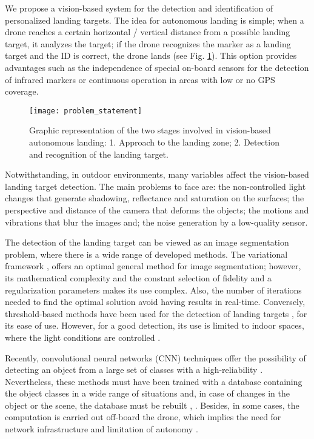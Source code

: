 We propose a vision-based system for the detection and identification of personalized landing targets. The idea for autonomous landing is simple; when a drone reaches a certain horizontal / vertical distance from a possible landing target, it analyzes the target; if the drone recognizes the marker as a landing target and the ID is correct, the drone lands (see Fig. \ref{fig:visionbased_landing_problem_sketch}). This option provides advantages such as the independence of special on-board sensors for the detection of infrared markers or continuous operation in areas with low or no GPS coverage. 

\begin{figure}[!ht]
    \centering
    \texttt{[image: problem\_statement]}        
    \caption{Graphic representation of the two stages involved in vision-based autonomous landing: 1. Approach to the landing zone; 2. Detection and recognition of the landing target.}\label{fig:visionbased_landing_problem_sketch}
\end{figure}

Notwithstanding, in outdoor environments, many variables affect the vision-based landing target detection. 
The main problems to face are: the non-controlled light changes that generate shadowing, reflectance and saturation on the surfaces; the perspective and distance of the camera that deforms the objects; the motions and vibrations that blur the images and; the noise generation by a low-quality sensor.


The detection of the landing target can be viewed as an image segmentation problem, where there is a wide range of developed methods. The variational framework \citep{Mumford.Shah:CPAM:1989}, offers an optimal general method for image segmentation; however, its mathematical complexity and the constant selection of fidelity and a regularization parameters makes its use complex. Also, the number of iterations needed to find the optimal solution avoid having results in real-time. Conversely, threshold-based methods have been used for the detection of landing targets \citep{Lacroix.Caballero:IROS:2006}, \citep{Lange.Sunderhauf.ea:SIMPAR:2008} for its ease of use. However, for a good detection, its use is limited to indoor spaces, where the light conditions are controlled \citep{Araar.Aouf.ea:IROS:2017}. 

Recently, convolutional neural networks (CNN) techniques offer the possibility of detecting an object from a large set of classes with a high-reliability \citep{Carrio.Sampedro.ea:JS:2017}. Nevertheless, these methods must have been trained with a database containing the object classes in a wide range of situations and, in case of changes in the object or the scene, the database must be rebuilt \citep{Yao.Yu.ea:CCC:2017}, \citep{Furukawa:TechRep:2018}. Besides, in some cases, the computation is carried out off-board the drone, which implies the need for network infrastructure and limitation of autonomy \citep{Lee.Wang.ea:IRC:2017}.

